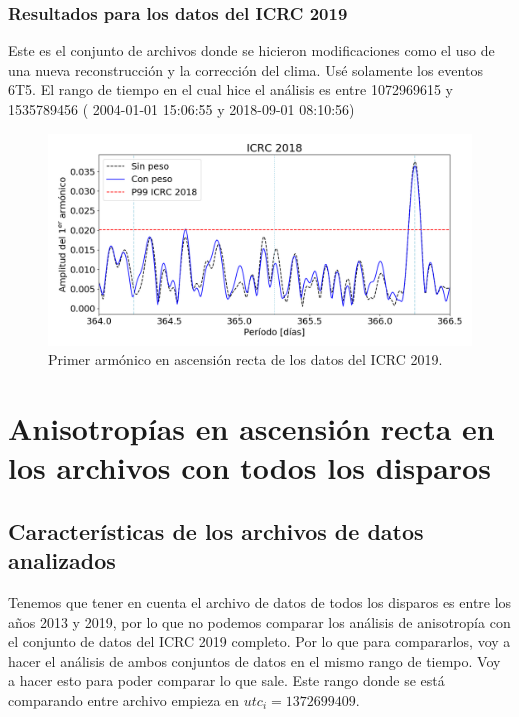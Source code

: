 			\subsubsection{Resultados para los datos del ICRC 2019}
			
			Este es el conjunto de archivos donde se hicieron modificaciones como el uso de una nueva reconstrucción y la corrección del clima. Usé solamente los eventos 6T5. El rango de tiempo en el cual hice  el análisis es entre 1072969615 y 1535789456 (	2004-01-01 15:06:55 y 	2018-09-01 08:10:56)

			\begin{figure}[H]
				\centering
				\includegraphics[width=\textwidth]{../Anisotropia/ICRC/ICRC2019_Eraw_Eraw_hex.png}
				\caption{Primer armónico en ascensión recta de los datos del ICRC 2019.} \label{fig:8EeV_con_peso_ICRC2019}
			\end{figure}


			
	\section{Anisotropías en ascensión recta en los archivos con todos los disparos}
		\subsection{Características de los archivos de datos analizados}

			Tenemos que tener en cuenta el archivo de datos de todos los disparos es entre los años 2013 y 2019, por lo que no podemos comparar los análisis de anisotropía con el conjunto  de datos del ICRC 2019 completo. Por lo que para compararlos, voy a hacer el análisis de ambos conjuntos de datos en el mismo rango de tiempo. Voy a hacer esto para poder comparar lo que sale. 			Este rango donde se está comparando entre archivo empieza en  $utc_i = 1372699409 $.

